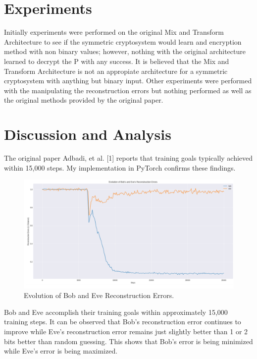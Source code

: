 \documentclass[12pt]{article}
\begin{document}
\section{Experiments}
Initially experiments were performed on the original Mix and Transform Architecture to see if the symmetric cryptosystem would learn and encryption method with non binary values; however, nothing with the original architecture learned to decrypt the P with any success. It is believed that the Mix and Transform Architecture is not an appropiate architecture for a symmetric cryptosystem with anything but binary input. Other experiments were performed with the manipulating the reconstruction errors but nothing performed as well as the original methods provided by the original paper.

\section{Discussion and Analysis}

The original paper Adbadi, et al. [1] reports that training goals typically achieved within 15,000 steps. My implementation in PyTorch confirms these findings.

\begin{figure}[h]
\includegraphics[width=16cm]{../assets/EvolutionOfBobAndEveReconstructionErrors.png}
\caption{Evolution of Bob and Eve Reconstruction Errors.}
\centering
\end{figure}

Bob and Eve accomplish their training goals within approximately 15,000 training steps. It can be observed that Bob's reconstruction error continues to improve while Eve's reconstruction error remains just slightly better than 1 or 2 bits better than random guessing. This shows that Bob's error is being minimized while Eve's error is being maximized.
\end{document}
